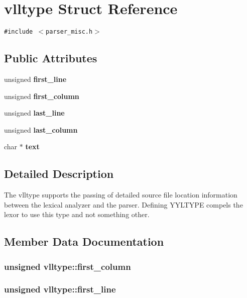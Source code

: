 \section{vlltype Struct Reference}
\label{structvlltype}
{\tt \#include $<$parser\_\-misc.h$>$}

\subsection*{Public Attributes}
\begin{CompactItemize}
\item 
unsigned {\bf first\_\-line}
\item 
unsigned {\bf first\_\-column}
\item 
unsigned {\bf last\_\-line}
\item 
unsigned {\bf last\_\-column}
\item 
char $\ast$ {\bf text}
\end{CompactItemize}


\subsection{Detailed Description}
The vlltype supports the passing of detailed source file location information between the lexical analyzer and the parser. Defining YYLTYPE compels the lexor to use this type and not something other. 



\subsection{Member Data Documentation}
\subsubsection{\setlength{\rightskip}{0pt plus 5cm}unsigned vlltype::first\_\-column}\label{structvlltype_m1}


\subsubsection{\setlength{\rightskip}{0pt plus 5cm}unsigned vlltype::first\_\-line}\label{structvlltype_m0}



